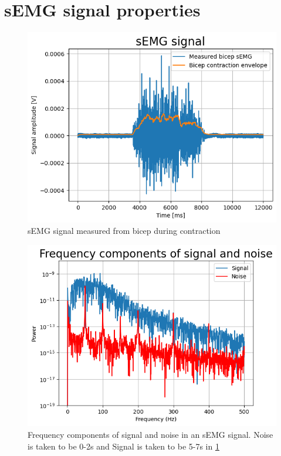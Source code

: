 \section{sEMG signal properties}

\begin{figure}[h!t]
	\begin{center}
		\includegraphics[width=1.0\columnwidth]{images/sEMG_signal_example.png}
	\end{center}
	\caption{sEMG signal measured from bicep during contraction}
	\label{fig:sEMG_signal_example}
\end{figure}

\begin{figure}[h!t]
	\begin{center}
		\includegraphics[width=1.0\columnwidth]{images/sEMG_fft_signalnoise_example.png}
	\end{center}
	\caption{Frequency components of signal and noise in an sEMG signal. 
    Noise is taken to be 0-2s and Signal is taken to be 5-7s in \ref{fig:sEMG_signal_example}}
	\label{fig:sEMG_fft_signalnoise_example}
\end{figure}

